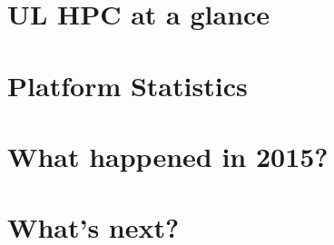 \documentclass{article}
\begin{document}
\ulhpctoc

\begin{welcome}
  
\end{welcome}


\section{\faCommentAlt\ UL HPC at a glance}

\clearpage

\section{\faBarChart\ Platform Statistics}





\section{\faBullhorn\ What happened in 2015?}


\clearpage






\section{\faTime\ What's next?}








\end{document}
